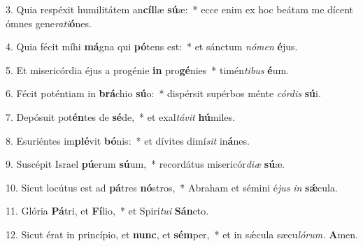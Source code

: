 \item 3. Quia respéxit humilitátem an\textbf{cíl}læ \textbf{sú}æ:~* ecce enim ex hoc beátam me dícent ómnes gene\textit{rati}\textbf{ó}nes.

\item 4. Quia fécit míhi \textbf{má}gna qui \textbf{pó}tens est:~* et sánctum \textit{nómen} \textbf{é}jus.

\item 5. Et misericórdia éjus a progénie \textbf{in} pro\textbf{gé}nies~* timén\textit{tibus} \textbf{é}um.

\item 6. Fécit poténtiam in \textbf{brá}chio \textbf{sú}o:~* dispérsit supérbos ménte \textit{córdis} \textbf{sú}i.

\item 7. Depósuit pot\textbf{én}tes de \textbf{sé}de,~* et exal\textit{távit} \textbf{hú}miles.

\item 8. Esuriéntes im\textbf{plé}vit \textbf{bó}nis:~* et dívites dimí\textit{sit} in\textbf{á}nes.

\item 9. Suscépit Israel \textbf{pú}erum \textbf{sú}um,~* recordátus misericór\textit{diæ} \textbf{sú}æ.

\item 10. Sicut locútus est ad \textbf{pá}tres \textbf{nó}stros,~* Abraham et sémini é\textit{jus} \textit{in} \textbf{sǽ}cula.

\item 11. Glória \textbf{Pá}tri, et \textbf{Fí}lio,~* et Spirí\textit{tui} \textbf{Sán}cto.

\item 12. Sicut érat in princípio, et \textbf{nunc}, et \textbf{sém}per,~* et in sǽcula sæcu\textit{lórum.} \textbf{A}men.
